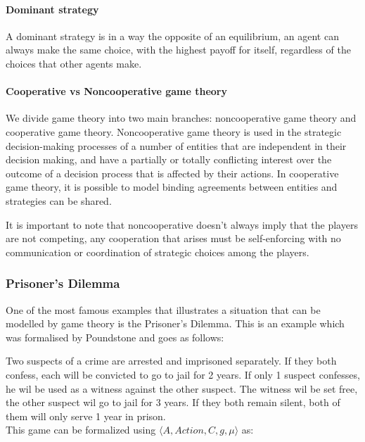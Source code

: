 \paragraph{Dominant strategy} 
A dominant strategy is in a way the opposite of an equilibrium, an agent can always make the same choice, with the highest payoff for itself, regardless of the choices that other agents make. 

\paragraph{Cooperative vs Noncooperative game theory} 
We divide game theory into two main branches: noncooperative game theory and cooperative game theory. Noncooperative game theory is used in the strategic decision-making processes of a number of entities that are independent in their decision making, and have a partially or totally conflicting interest over the outcome of a decision process that is affected by their actions\cite{keypaper}. In cooperative game theory, it is possible to model binding agreements between entities and strategies can be shared. 

It is important to note that noncooperative doesn't always imply that the players are not competing, any cooperation that arises must be self-enforcing with no communication or coordination of strategic choices among the players.\cite{keypaper}

\subsubsection{Prisoner's Dilemma}
One of the most famous examples that illustrates a situation that can be modelled by game theory is the Prisoner's Dilemma. This is an example which was formalised by Poundstone \cite{poundstone} and goes as follows: 

Two suspects of a crime are arrested and imprisoned separately. If they both confess, each will be convicted to go to jail for 2 years. If only 1 suspect confesses, he wil be used as a witness against the other suspect. The witness wil be set free, the other suspect wil go to jail for 3 years. If they both remain silent, both of them will only serve 1 year in prison.\\
This game can be formalized using $\langle A,Action,C,g,\mu \rangle$ as:

